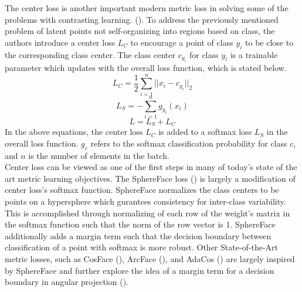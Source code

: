 \documentclass[./dissertation.tex]{subfiles}
\begin{document}
    The center loss is another important modern metric loss in solving some of the problems with contrasting learning. (\cite{10.1007/978-3-319-46478-7_31}). To address the previously mentioned problem of latent points not self-organizing into regions based on class, the authors introduce a center loss $L_{C}$ to encourage a point of class $y_{i}$ to be close to the corresponding class center. The class center $c_{y_{i}}$ for class $y_{i}$ is a trainable parameter which updates with the overall loss function, which is stated below.
    \begin{equation*}
    L_{C} = \frac{1}{2}\sum_{i = 1}^{n}||x_{i} - c_{y_{i}}||_{2} \end{equation*}
    \begin{equation*}
    L_{S} = - \sum_{i = 1}^{n} g_{y_i}(x_i)
    \end{equation*}
    \begin{equation*}
    L = L_{S} + L_{C}
    \end{equation*}
    In the above equations, the center loss $L_{C}$ is added to a softmax loss $L_{S}$ in the overall loss function. $g_{c}$ refers to the softmax classification probability for class $c$, and $n$ is the number of elements in the batch. \\
    
    Center loss can be viewed as one of the first steps in many of today's state of the art metric learning objectives. The SphereFace loss (\cite{liu2017sphereface}) is largely a modification of center loss's softmax function. SphereFace normalizes the class centers to be points on a hypersphere which gurantees consistency for inter-class variability. This is accomplished through normalizing of each row of the weight's matrix in the softmax function such that the norm of the row vector is 1. SphereFace additionally adds a margin term such that the decision boundary between classification of a point with softmax is more robust.  Other State-of-the-Art metric losses, such as CosFace (\cite{wang2018cosface}), ArcFace (\cite{deng2019arcface}), and AdaCos (\cite{zhang2019adacos}) are largely inspired by SphereFace and further explore the idea of a margin term for a decision boundary in angular projection (\cite{hav4ik2021deepmetriclearning}). \\
\end{document}
